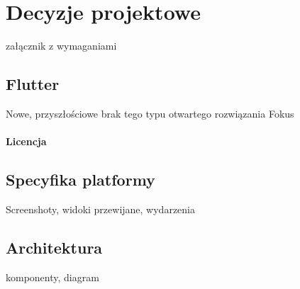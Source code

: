 \section{Decyzje projektowe}
załącznik z wymaganiami

\subsection{Flutter}
Nowe, przyszłościowe
brak tego typu otwartego rozwiązania
Fokus

\paragraph{Licencja}

\subsection{Specyfika platformy}
Screenshoty, widoki przewijane, wydarzenia

\subsection{Architektura}
komponenty, diagram
